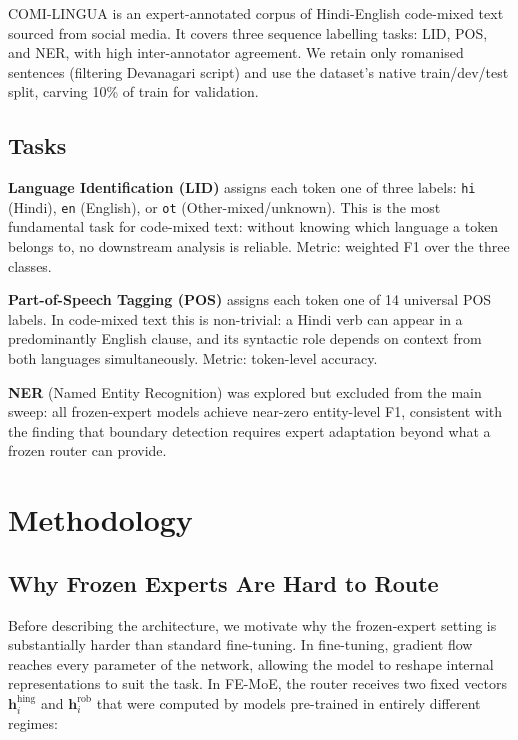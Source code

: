 \documentclass[conference]{IEEEtran}
\begin{document}
COMI-LINGUA \cite{sheth2024comilingua} is an expert-annotated corpus of Hindi-English code-mixed text sourced from social media. It covers three sequence labelling tasks: LID, POS, and NER, with high inter-annotator agreement. We retain only romanised sentences (filtering Devanagari script) and use the dataset's native train/dev/test split, carving 10\% of train for validation.

\subsection{Tasks}

\textbf{Language Identification (LID)} assigns each token one of three labels: \texttt{hi} (Hindi), \texttt{en} (English), or \texttt{ot} (Other-mixed/unknown). This is the most fundamental task for code-mixed text: without knowing which language a token belongs to, no downstream analysis is reliable. Metric: weighted F1 over the three classes.

\textbf{Part-of-Speech Tagging (POS)} assigns each token one of 14 universal POS labels. In code-mixed text this is non-trivial: a Hindi verb can appear in a predominantly English clause, and its syntactic role depends on context from both languages simultaneously. Metric: token-level accuracy.

\textbf{NER} (Named Entity Recognition) was explored but excluded from the main sweep: all frozen-expert models achieve near-zero entity-level F1, consistent with the finding that boundary detection requires expert adaptation beyond what a frozen router can provide.

\section{Methodology}

\subsection{Why Frozen Experts Are Hard to Route}

Before describing the architecture, we motivate why the frozen-expert setting is substantially harder than standard fine-tuning. In fine-tuning, gradient flow reaches every parameter of the network, allowing the model to reshape internal representations to suit the task. In FE-MoE, the router receives two fixed vectors $\mathbf{h}^{\text{hing}}_i$ and $\mathbf{h}^{\text{rob}}_i$ that were computed by models pre-trained in entirely different regimes:
\end{document}
